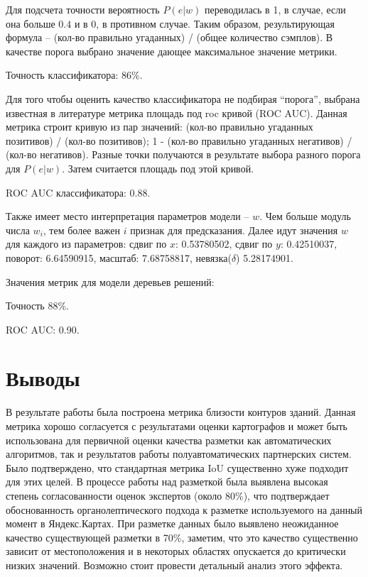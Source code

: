 \documentclass[12pt]{article}
\begin{document}
Для подсчета точности вероятность $P(e | w)$ переводилась в 1, в случае, если она больше $0.4$ и в 0, в противном случае. Таким образом, результирующая формула -- (кол-во правильно угаданных) / (общее количество сэмплов). В качестве порога выбрано значение дающее максимальное значение метрики.

Точность классификатора: 86\%.

Для того чтобы оценить качество классификатора не подбирая ``порога'', выбрана известная в литературе метрика площадь под roc кривой (ROC AUC). Данная метрика строит кривую из пар значений: (кол-во правильно угаданных позитивов)  / (кол-во позитивов); 1 - (кол-во правильно угаданных негативов) / (кол-во негативов). Разные точки получаются в результате выбора разного порога для $P(e | w)$. Затем считается площадь под этой кривой.

ROC AUC классификатора: 0.88.

Также имеет место интерпретация параметров модели -- $w$. Чем больше модуль числа $w_i$, тем более важен $i$ признак для предсказания. Далее идут значения $w$ для каждого из параметров:
сдвиг по $x$: 0.53780502, сдвиг по $y$: 0.42510037, поворот: 6.64590915, масштаб: 7.68758817, невязка($\delta$) 5.28174901.

Значения метрик для модели деревьев решений:

Точность 88\%.

ROC AUC: 0.90.

\section{Выводы}
\label{conclusions}
В результате работы была построена метрика близости контуров зданий. Данная метрика хорошо согласуется с результатами оценки картографов и может быть использована для первичной оценки качества разметки как автоматических алгоритмов, так и результатов работы полуавтоматических партнерских систем. Было подтверждено, что стандартная метрика IoU существенно хуже подходит для этих целей. В процессе работы над разметкой была выявлена высокая степень согласованности оценок экспертов (около 80\%), что подтверждает обоснованность органолептического подхода к разметке используемого на данный момент в Яндекс.Картах. При разметке данных было выявлено неожиданное качество существующей разметки в 70\%, заметим, что это качество существенно зависит от местоположения и в некоторых областях опускается до критически низких значений. Возможно стоит провести детальный анализ этого эффекта.
\end{document}
